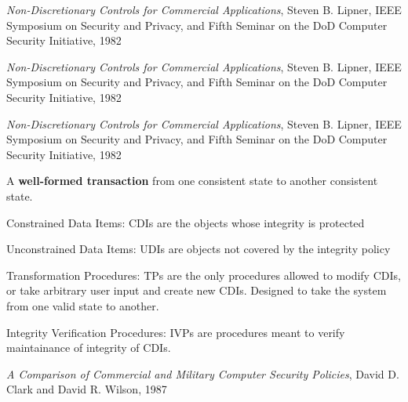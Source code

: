 \documentclass[Screen16to9,17pt]{foils}
\begin{document}

\emph{Non-Discretionary Controls for Commercial Applications}, Steven B. Lipner, IEEE Symposium on Security and Privacy, and Fifth Seminar on the DoD Computer Security Initiative, 1982



\emph{Non-Discretionary Controls for Commercial Applications}, Steven B. Lipner, IEEE Symposium on Security and Privacy, and Fifth Seminar on the DoD Computer Security Initiative, 1982



\emph{Non-Discretionary Controls for Commercial Applications}, Steven B. Lipner, IEEE Symposium on Security and Privacy, and Fifth Seminar on the DoD Computer Security Initiative, 1982





A {\bf well-formed transaction} from one consistent state to another consistent state.

\begin{list2}
\item Constrained Data Items: CDIs are the objects whose
integrity is protected
\item Unconstrained Data Items: UDIs are objects not covered by
the integrity policy
\item Transformation Procedures: TPs are the only procedures
allowed to modify CDIs, or take arbitrary user input and
create new CDIs. Designed to take the system from one valid
state to another.
\item Integrity Verification Procedures: IVPs are procedures
meant to verify maintainance of integrity of CDIs.
\end{list2}

\emph{A Comparison of Commercial and Military Computer Security Policies},
David D. Clark and David R. Wilson, 1987

\end{document}
